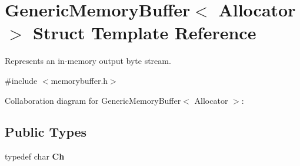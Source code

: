 \hypertarget{struct_generic_memory_buffer}{}\section{Generic\+Memory\+Buffer$<$ Allocator $>$ Struct Template Reference}
\label{struct_generic_memory_buffer}


Represents an in-\/memory output byte stream.  




{\ttfamily \#include $<$memorybuffer.\+h$>$}



Collaboration diagram for Generic\+Memory\+Buffer$<$ Allocator $>$\+:
\subsection*{Public Types}
\begin{DoxyCompactItemize}
\item 
\mbox{\label{struct_generic_memory_buffer_a212f137abfd8bce2ad216b2d960c027f}} 
typedef char {\bfseries Ch}
\end{DoxyCompactItemize}

